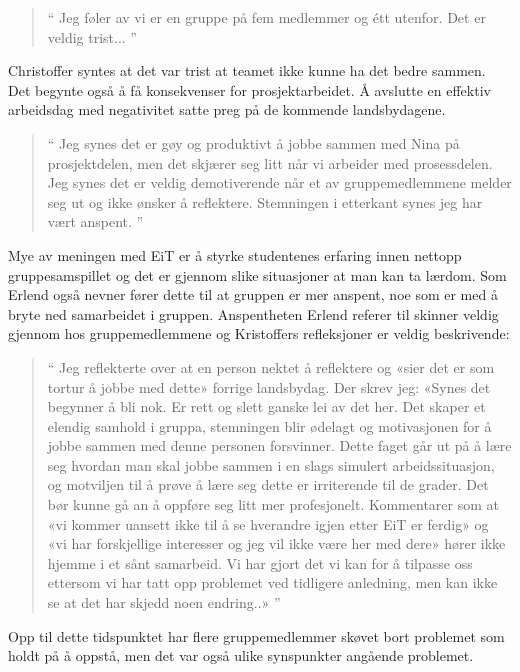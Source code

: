 \begin{quote}``
Jeg føler av vi er en gruppe på fem medlemmer og étt utenfor. Det er veldig trist...
''\end{quote} 

Christoffer syntes at det var trist at teamet ikke kunne ha det bedre sammen. Det begynte også å få konsekvenser
for prosjektarbeidet. Å avslutte en effektiv arbeidsdag med negativitet satte preg på de kommende landsbydagene.

\begin{quote}``
Jeg synes det er gøy og produktivt å jobbe sammen med Nina på prosjektdelen, men det skjærer seg litt når vi 
arbeider med prosessdelen. Jeg synes det er veldig demotiverende når et av gruppemedlemmene melder seg ut 
og ikke ønsker å reflektere. Stemningen i etterkant synes jeg har vært anspent.
''\end{quote} 

Mye av meningen med EiT er å styrke studentenes erfaring innen nettopp gruppesamspillet og det er gjennom
slike situasjoner at man kan ta lærdom. 
Som Erlend også nevner fører dette til at gruppen er mer anspent, noe som er med å bryte ned samarbeidet i 
gruppen. Anspentheten Erlend referer til skinner veldig gjennom hos gruppemedlemmene og Kristoffers refleksjoner 
er veldig beskrivende:

\begin{quote}``
Jeg reflekterte over at en person nektet å reflektere og «sier det er som tortur å jobbe med dette» forrige 
landsbydag. Der skrev jeg: «Synes det begynner å bli nok. Er rett og slett ganske lei av det her. Det skaper et 
elendig samhold i gruppa, stemningen blir ødelagt og motivasjonen for å jobbe sammen med denne personen 
forsvinner. Dette faget går ut på å lære seg hvordan man skal jobbe sammen i en slags simulert arbeidssituasjon, 
og motviljen til å prøve å lære seg dette er irriterende til de grader. Det bør kunne gå an å oppføre seg litt mer 
profesjonelt. Kommentarer som at «vi kommer uansett ikke til å se hverandre igjen etter EiT er ferdig» og «vi har 
forskjellige interesser og jeg vil ikke være her med dere» hører ikke hjemme i et sånt samarbeid. Vi har gjort det 
vi kan for å tilpasse oss ettersom vi har tatt opp problemet ved tidligere anledning, men kan ikke se at det har 
skjedd noen endring..» 
''\end{quote} 

Opp til dette tidspunktet har flere gruppemedlemmer skøvet bort problemet som holdt på å oppstå, men det var også 
ulike synspunkter angående problemet.

